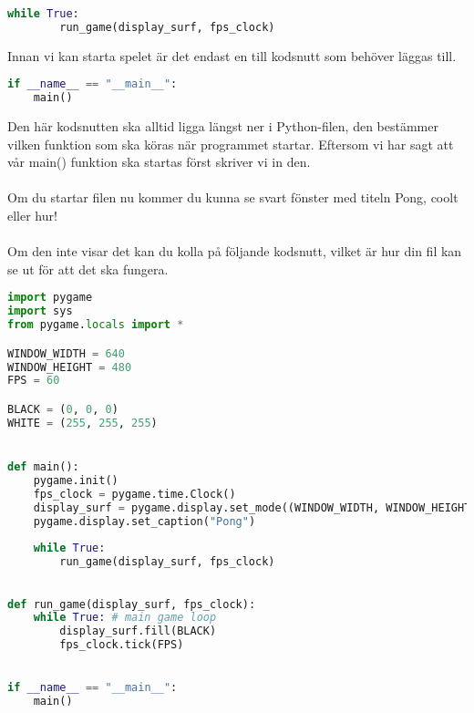 \documentclass{article}
\begin{document}
\begin{lstlisting}[language=Python]
	while True:
		run_game(display_surf, fps_clock)
\end{lstlisting}
Innan vi kan starta spelet är det endast en till kodsnutt som behöver läggas till.
\begin{lstlisting}[language=Python]
if __name__ == "__main__":
	main()
\end{lstlisting}
Den här kodsnutten ska alltid ligga längst ner i Python-filen, den bestämmer vilken funktion som ska köras när programmet startar. Eftersom vi har sagt att vår main() funktion ska startas först skriver vi in den.\\
\\
Om du startar filen nu kommer du kunna se svart fönster med titeln Pong, coolt eller hur!\\
\\
Om den inte visar det kan du kolla på följande kodsnutt, vilket är hur din fil kan se ut för att det ska fungera.
\begin{lstlisting}[language=Python, style=mystyle_numbers]
import pygame
import sys
from pygame.locals import *

WINDOW_WIDTH = 640
WINDOW_HEIGHT = 480
FPS = 60

BLACK = (0, 0, 0)
WHITE = (255, 255, 255)


def main():
	pygame.init()
	fps_clock = pygame.time.Clock()
	display_surf = pygame.display.set_mode((WINDOW_WIDTH, WINDOW_HEIGHT))
	pygame.display.set_caption("Pong")
	
	while True:
		run_game(display_surf, fps_clock)

		
def run_game(display_surf, fps_clock):
	while True: # main game loop
		display_surf.fill(BLACK)
		fps_clock.tick(FPS)
		

if __name__ == "__main__":
	main()
\end{lstlisting}


\newpage

\end{document}
